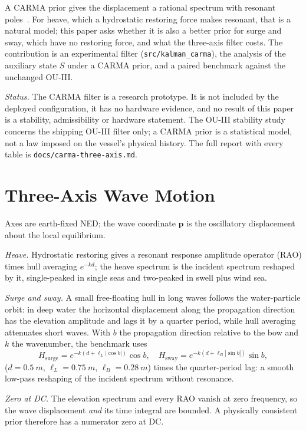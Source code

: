 \documentclass[conference]{IEEEtran}
\DeclareRobustCommand{\vct}[1]{\bm{#1}}
\theoremstyle{bodysmall}
\begin{document}
A CARMA prior gives the displacement a rational spectrum with resonant
poles~\cite{brockwell01,brockwell04}. For heave, which a hydrostatic restoring
force makes resonant, that is a natural model; this paper asks whether it is
also a better prior for surge and sway, which have no restoring force, and
what the three-axis filter costs. The contribution is an experimental filter
(\texttt{src/kalman\_carma}), the analysis of the auxiliary state $S$ under a
CARMA prior, and a paired benchmark against the unchanged OU-III.

\emph{Status.} The CARMA filter is a research prototype. It is not included
by the deployed configuration, it has no hardware evidence, and no result of
this paper is a stability, admissibility or hardware statement. The OU-III
stability study concerns the shipping OU-III filter only; a CARMA prior is a
statistical model, not a law imposed on the vessel's physical history. The
full report with every table is \texttt{docs/carma-three-axis.md}.

\section{Three-Axis Wave Motion}
\label{sec:physics}
Axes are earth-fixed NED; the wave coordinate $\vct{p}$ is the oscillatory
displacement about the local equilibrium.

\emph{Heave.} Hydrostatic restoring gives a resonant response amplitude
operator (RAO) times hull averaging $e^{-kd}$; the heave spectrum is the
incident spectrum reshaped by it, single-peaked in single seas and
two-peaked in swell plus wind sea.

\emph{Surge and sway.} A small free-floating hull in long waves follows the
water-particle orbit: in deep water the horizontal displacement along the
propagation direction has the elevation amplitude and lags it by a quarter
period, while hull averaging attenuates short waves. With $b$ the
propagation direction relative to the bow and $k$ the wavenumber, the
benchmark uses
\begin{equation}
H_{\mathrm{surge}}=e^{-k(d+\ell_L|\cos b|)}\cos b,\quad
H_{\mathrm{sway}}=e^{-k(d+\ell_B|\sin b|)}\sin b,
\label{eq:horiz-rao}
\end{equation}
($d=\SI{0.5}{m}$, $\ell_L=\SI{0.75}{m}$, $\ell_B=\SI{0.28}{m}$) times the
quarter-period lag: a smooth low-pass reshaping of the incident spectrum
without resonance.

\emph{Zero at DC.} The elevation spectrum and every RAO vanish at zero
frequency, so the wave displacement \emph{and} its time integral are
bounded. A physically consistent prior therefore has a numerator zero at DC.
\end{document}
